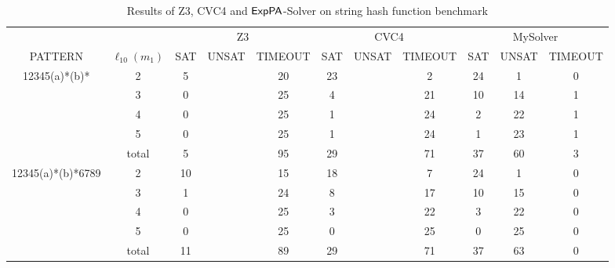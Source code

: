 \begin{table*}[]
    \label{table:string}
    \caption{Results of Z3, CVC4 and ${\sf ExpPA}$-Solver on string hash function benchmark}
    \begin{tabular}{c|c|ccc|ccc|ccc}
                                                       &     & \multicolumn{3}{c|}{Z3} & \multicolumn{3}{c|}{CVC4} & \multicolumn{3}{c}{MySolver}       \\
    PATTERN                                            & $\ell_{10}(m_1)$   & SAT  & UNSAT  & TIMEOUT & SAT   & UNSAT  & TIMEOUT  & SAT & UNSAT & TIMEOUT              \\ \hline
    \multirow{5}{*}{12345(a)*(b)*}                     & 2   & 5    &        & 20      & 23    &        & 2        & 24  & 1     & 0                    \\
                                                       & 3   & 0    &        & 25      & 4     &        & 21       & 10  & 14    & 1                    \\
                                                       & 4   & 0    &        & 25      & 1     &        & 24       & 2   & 22    & 1                    \\
                                                       & 5   & 0    &        & 25      & 1     &        & 24       & 1   & 23    & 1                    \\
                                                       & total & 5    &        & 95      & 29    &        & 71       & 37  & 60    & 3                    \\ \hline
    \multirow{5}{*}{12345(a)*(b)*6789}                 & 2   & 10   &        & 15      & 18    &        & 7        & 24  & 1     & 0                    \\
                                                       & 3   & 1    &        & 24      & 8     &        & 17       & 10  & 15    & 0                    \\
                                                       & 4   & 0    &        & 25      & 3     &        & 22       & 3   & 22    & 0                    \\
                                                       & 5   & 0    &        & 25      & 0     &        & 25       & 0   & 25    & 0                    \\
                                                       & total & 11   &        & 89      & 29    &        & 71       & 37  & 63    & 0                    \\ \hline

\end{tabular}
\end{table*}
